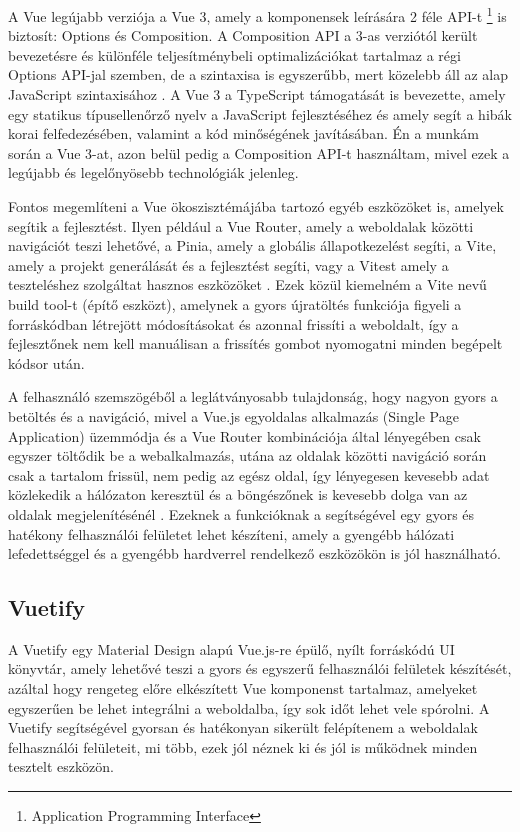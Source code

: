 A Vue legújabb verziója a Vue 3, amely a komponensek leírására 2 féle API-t \footnote{Application Programming Interface} is biztosít: Options és Composition. A Composition API a 3-as verziótól került bevezetésre és különféle teljesítménybeli optimalizációkat tartalmaz a régi Options API-jal szemben, de a szintaxisa is egyszerűbb, mert közelebb áll az alap JavaScript szintaxisához \cite{vue3}. A Vue 3 a TypeScript támogatását is bevezette, amely egy statikus típusellenőrző nyelv a JavaScript fejlesztéséhez és amely segít a hibák korai felfedezésében, valamint a kód minőségének javításában. Én a munkám során a Vue 3-at, azon belül pedig a Composition API-t használtam, mivel ezek a legújabb és legelőnyösebb technológiák jelenleg.

Fontos megemlíteni a Vue ökoszisztémájába tartozó egyéb eszközöket is, amelyek segítik a fejlesztést. Ilyen például a Vue Router, amely a weboldalak közötti navigációt teszi lehetővé, a Pinia, amely a globális állapotkezelést segíti, a Vite, amely a projekt generálását és a fejlesztést segíti, vagy a Vitest amely a teszteléshez szolgáltat hasznos eszközöket \cite{vue3}. Ezek közül kiemelném a Vite nevű build tool-t (építő eszközt), amelynek a gyors újratöltés funkciója figyeli a forráskódban létrejött módosításokat és azonnal frissíti a weboldalt, így a fejlesztőnek nem kell manuálisan a frissítés gombot nyomogatni minden begépelt kódsor után.

A felhasználó szemszögéből a leglátványosabb tulajdonság, hogy nagyon gyors a betöltés és a navigáció, mivel a Vue.js egyoldalas alkalmazás (Single Page Application) üzemmódja és a Vue Router kombinációja által lényegében csak egyszer töltődik be a webalkalmazás, utána az oldalak közötti navigáció során csak a tartalom frissül, nem pedig az egész oldal, így lényegesen kevesebb adat közlekedik a hálózaton keresztül és a böngészőnek is kevesebb dolga van az oldalak megjelenítésénél \cite{vue3}. Ezeknek a funkcióknak a segítségével egy gyors és hatékony felhasználói felületet lehet készíteni, amely a gyengébb hálózati lefedettséggel és a gyengébb hardverrel rendelkező eszközökön is jól használható.

\subsection{Vuetify}
A Vuetify egy Material Design alapú Vue.js-re épülő, nyílt forráskódú UI könyvtár, amely lehetővé teszi a gyors és egyszerű felhasználói felületek készítését, azáltal hogy rengeteg előre elkészített Vue komponenst tartalmaz, amelyeket egyszerűen be lehet integrálni a weboldalba, így sok időt lehet vele spórolni. A Vuetify segítségével gyorsan és hatékonyan sikerült felépítenem a weboldalak felhasználói felületeit, mi több, ezek jól néznek ki és jól is működnek minden tesztelt eszközön.

